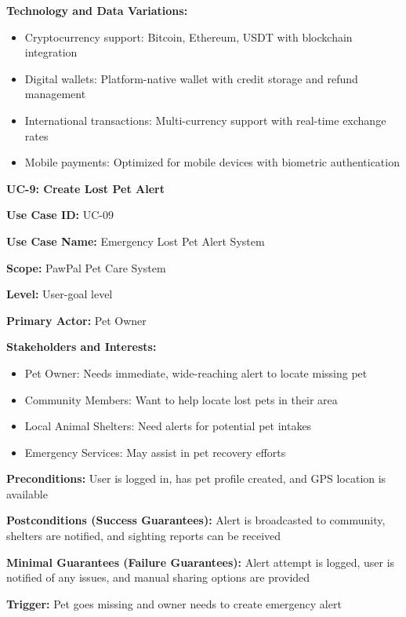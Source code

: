 \textbf{Technology and Data Variations:}
\begin{itemize}
    \item Cryptocurrency support: Bitcoin, Ethereum, USDT with blockchain integration
    \item Digital wallets: Platform-native wallet with credit storage and refund management
    \item International transactions: Multi-currency support with real-time exchange rates
    \item Mobile payments: Optimized for mobile devices with biometric authentication
\end{itemize}

\textbf{UC-9: Create Lost Pet Alert}

\textbf{Use Case ID:} UC-09

\textbf{Use Case Name:} Emergency Lost Pet Alert System

\textbf{Scope:} PawPal Pet Care System

\textbf{Level:} User-goal level

\textbf{Primary Actor:} Pet Owner

\textbf{Stakeholders and Interests:}
\begin{itemize}
    \item Pet Owner: Needs immediate, wide-reaching alert to locate missing pet
    \item Community Members: Want to help locate lost pets in their area
    \item Local Animal Shelters: Need alerts for potential pet intakes
    \item Emergency Services: May assist in pet recovery efforts
\end{itemize}

\textbf{Preconditions:} User is logged in, has pet profile created, and GPS location is available

\textbf{Postconditions (Success Guarantees):} Alert is broadcasted to community, shelters are notified, and sighting reports can be received

\textbf{Minimal Guarantees (Failure Guarantees):} Alert attempt is logged, user is notified of any issues, and manual sharing options are provided

\textbf{Trigger:} Pet goes missing and owner needs to create emergency alert

